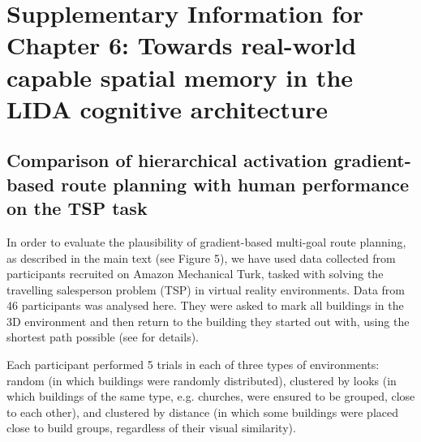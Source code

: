 %
%


\chapter{Supplementary Information for Chapter 6: Towards real-world capable spatial memory in the LIDA cognitive architecture}
\label{apx:lidaspm}
\section{Comparison of hierarchical activation gradient-based route planning with human performance on the TSP task}


In order to evaluate the plausibility of gradient-based multi-goal route planning, as described in the main text (see Figure 5), we have used data collected from participants recruited on Amazon Mechanical Turk, tasked with solving the travelling salesperson problem (TSP) in virtual reality environments. Data from 46 participants was analysed here. They were asked to mark all buildings in the 3D environment and then return to the building they started out with, using the shortest path possible (see \citep{madl2013spatial} for details). 

Each participant performed 5 trials in each of three types of environments: random (in which buildings were randomly distributed), clustered by looks (in which buildings of the same type, e.g. churches, were ensured to be grouped, close to each other), and clustered by distance (in which some buildings were placed close to build groups, regardless of their visual similarity).

